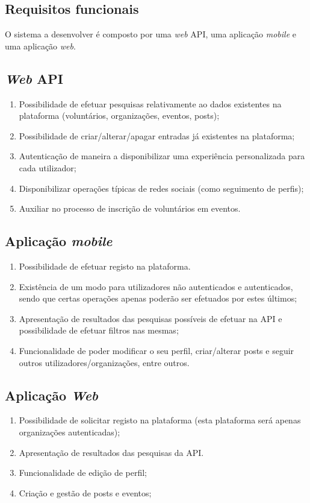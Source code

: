 \subsection{Requisitos funcionais}

O sistema a desenvolver é composto por uma \textit{web} API, uma aplicação \textit{mobile} e uma aplicação \textit{web}.

\subsection*{\textit{Web} API}

\begin{enumerate}
	\item Possibilidade de efetuar pesquisas relativamente ao dados existentes na plataforma (voluntários, organizações, eventos, posts);
	\item Possibilidade de criar/alterar/apagar entradas já existentes na plataforma;
	\item Autenticação de maneira a disponibilizar uma experiência personalizada para cada utilizador;
	\item Disponibilizar operações típicas de redes sociais (como seguimento de perfis);
	\item Auxiliar no processo de inscrição de voluntários em eventos.
\end{enumerate}

\subsection*{Aplicação \textit{mobile}}

\begin{enumerate}
	\item Possibilidade de efetuar registo na plataforma.
	\item Existência de um modo para utilizadores não autenticados e autenticados, sendo que certas operações apenas poderão ser efetuados por estes últimos;
	\item Apresentação de resultados das pesquisas possíveis de efetuar na API e possibilidade de efetuar filtros nas mesmas;
	\item Funcionalidade de poder modificar o seu perfil, criar/alterar posts e seguir outros utilizadores/organizações, entre outros.
\end{enumerate}

\subsection*{Aplicação \textit{Web}}

\begin{enumerate}
	\item Possibilidade de solicitar registo na plataforma (esta plataforma será apenas organizações autenticadas);
	\item Apresentação de resultados das pesquisas da API.
	\item Funcionalidade de edição de perfil;
	\item Criação e gestão de posts e eventos;
\end{enumerate}
